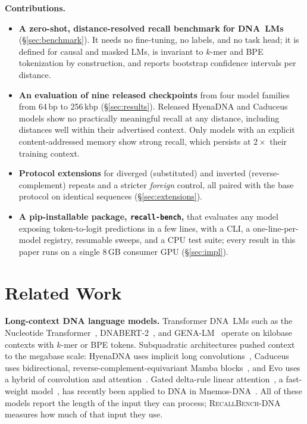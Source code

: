 \textbf{Contributions.}
\begin{itemize}
  \item \textbf{A zero-shot, distance-resolved recall benchmark for DNA~LMs}
    (\S\ref{sec:benchmark}). It needs no fine-tuning, no labels, and no task head; it is
    defined for causal and masked LMs, is invariant to $k$-mer and BPE tokenization by
    construction, and reports bootstrap confidence intervals per distance.
  \item \textbf{An evaluation of nine released checkpoints} from four model families from
    64\,bp to 256\,kbp (\S\ref{sec:results}). Released HyenaDNA and Caduceus models show
    no practically meaningful recall at any distance, including distances well within
    their advertised context. Only models with an explicit content-addressed memory show
    strong recall, which persists at $2\times$ their training context.
  \item \textbf{Protocol extensions} for diverged (substituted) and inverted
    (reverse-complement) repeats and a stricter \emph{foreign} control, all paired with the
    base protocol on identical sequences (\S\ref{sec:extensions}).
  \item \textbf{A pip-installable package, \texttt{recall-bench},} that evaluates any model
    exposing token-to-logit predictions in a few lines, with a CLI, a one-line-per-model
    registry, resumable sweeps, and a CPU test suite; every result in this paper runs on a
    single 8\,GB consumer GPU (\S\ref{sec:impl}).
\end{itemize}

\section{Related Work}
\label{sec:related}

\textbf{Long-context DNA language models.} Transformer DNA~LMs such as the Nucleotide
Transformer~\cite{dallatorre2025nt}, DNABERT-2~\cite{zhou2024dnabert2}, and
GENA-LM~\cite{fishman2025genalm} operate on kilobase contexts with $k$-mer or BPE tokens.
Subquadratic architectures pushed context to the megabase scale: HyenaDNA uses implicit
long convolutions~\cite{nguyen2023hyenadna}, Caduceus uses bidirectional,
reverse-complement-equivariant Mamba blocks~\cite{schiff2024caduceus,gu2024mamba}, and Evo
uses a hybrid of convolution and attention~\cite{nguyen2024evo,brixi2025evo2}. Gated
delta-rule linear attention~\cite{yang2025gdn,kimi2025linear}, a fast-weight
model~\cite{schlag2021fastweights}, has recently been applied to DNA in
Mnemos-DNA~\cite{balyan2026mnemos}. All of these models report the length of the input
they can process; \textsc{RecallBench-DNA} measures how much of that input they use.

